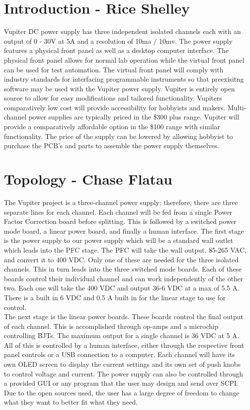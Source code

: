 \documentclass[12pt]{article}
\begin{document}
\section{Introduction - Rice Shelley}
Vupiter DC power supply has three independent isolated channels each with an output of 0 - 30V at 5A and a resolution of 10ma / 10mv. The power supply features a physical front panel as well as a desktop computer interface. The physical front panel allows for normal lab operation while the virtual front panel can be used for test automation. The virtual front panel will comply with industry standards for interfacing programmable instruments so that preexisitng software may be used with the Vupiter power supply. Vupiter is entirely open source to allow for easy modifications and tailored functionality. Vupiters comparatively low cost will provide accessibility for hobbyists and makers. Multi-channel power supplies are typically priced in the \$300 plus range. Vupiter will provide a comparatively affordable option in the \$100 range with similar functionality. The price of the supply can be lowered by allowing hobbyist to purchase the PCB’s and parts to assemble the power supply themselves.

\section{Topology - Chase Flatau}
The Vupiter project is a three-channel power supply; therefore, there are three separate lines for each channel. Each channel will be fed from a single Power Factor Correction board before splitting. This is followed by a switched power mode board, a linear power board, and finally a human interface. The first stage is the power supply to our power supply which will be a standard wall outlet which leads into the PFC stage. The PFC will take the wall output, 85-265 VAC, and convert it to 400 VDC. Only one of these are needed for the three isolated channels. This in turn leads into the three switched mode boards. Each of these boards control their individual channel and can work independently of the other two. Each one will take the 400 VDC and output 36-6 VDC at a max of 5.5 A. There is a built in 6 VDC and 0.5 A built in for the linear stage to use for control.\\

The next stage is the linear power boards. These boards control the final output of each channel. This is accomplished through op-amps and a microchip controlling BJTs. The maximum output for a single channel is 36 VDC at 5 A. All of this is controlled by a human interface, either through the respective front panel controls or a USB connection to a computer. Each channel will have its own OLED screen to display the current settings and its own set of push knobs to control voltage and current. The power supply can also be controlled through a provided GUI or any program that the user may design and send over SCPI. Due to the open sources used, the user has a large degree of freedom to change what they want to better fit what they need.\\
\end{document}

